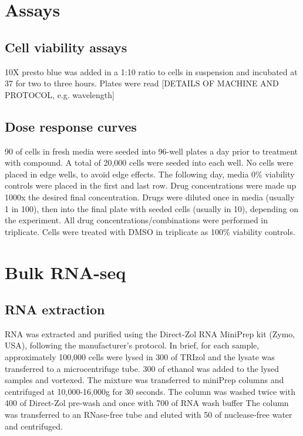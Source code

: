 \section{Assays}
\subsection{Cell viability assays}
10X presto blue was added in a 1:10 ratio to cells in suspension and incubated at 37\C{} for two to three hours.
Plates were read [DETAILS OF MACHINE AND PROTOCOL, e.g. wavelength]

\subsection{Dose response curves}\label{subsec:method_doseresponse}
90\ul{} of cells in fresh media were seeded into 96-well plates a day prior to treatment with compound.
A total of 20,000 cells were seeded into each well.
No cells were placed in edge wells, to avoid edge effects.
The following day, media 0\% viability controls were placed in the first and last row.
Drug concentrations were made up 1000x the desired final concentration.
Drugs were diluted once in media (usually 1 in 100), then into the final plate with seeded cells (usually in 10), depending on the experiment.
All drug concentrations/combinations were performed in triplicate.
Cells were treated with DMSO in triplicate as 100\% viability controls.

\section{Bulk RNA-seq}\label{sec:bulk_lib_prep}
\subsection{RNA extraction}\label{subsec:rna_extraction}
RNA was extracted and purified using the Direct-Zol RNA MiniPrep kit (Zymo, USA), following the manufacturer's protocol.
In brief, for each sample, approximately 100,000 cells were lysed in 300\ul{} of TRIzol and the lysate was transferred to a microcentrifuge tube.
300\ul{} of ethanol was added to the lysed samples and vortexed.
The mixture was transferred to miniPrep columns and centrifuged at 10,000-16,000g for 30 seconds.
The column was washed twice with 400\ul{} of Direct-Zol pre-wash and once with 700\ul{} of RNA wash buffer
The column was transferred to an RNase-free tube and eluted with 50\ul{} of nuclease-free water and centrifuged.

